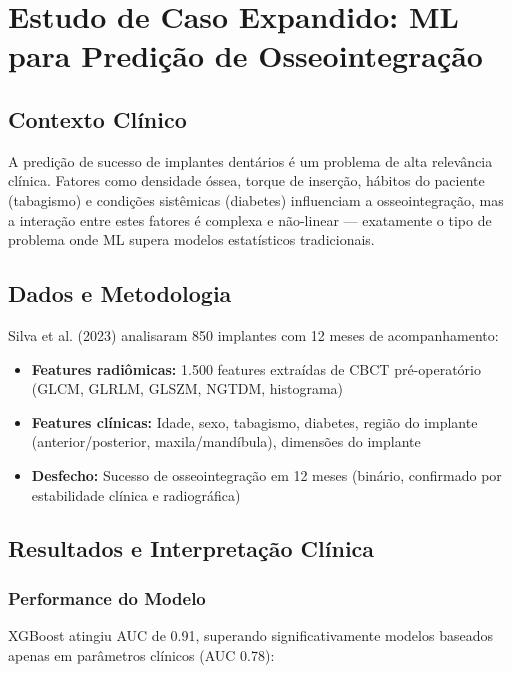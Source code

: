 \section{Estudo de Caso Expandido: ML para Predição de Osseointegração}

\subsection{Contexto Clínico}

A predição de sucesso de implantes dentários é um problema de alta relevância clínica. Fatores como densidade óssea, torque de inserção, hábitos do paciente (tabagismo) e condições sistêmicas (diabetes) influenciam a osseointegração, mas a interação entre estes fatores é complexa e não-linear — exatamente o tipo de problema onde ML supera modelos estatísticos tradicionais.

\subsection{Dados e Metodologia}

Silva et al. (2023) \cite{ODT-056} analisaram 850 implantes com 12 meses de acompanhamento:

\begin{itemize}
    \item \textbf{Features radiômicas:} 1.500 features extraídas de CBCT pré-operatório (GLCM, GLRLM, GLSZM, NGTDM, histograma)
    \item \textbf{Features clínicas:} Idade, sexo, tabagismo, diabetes, região do implante (anterior/posterior, maxila/mandíbula), dimensões do implante
    \item \textbf{Desfecho:} Sucesso de osseointegração em 12 meses (binário, confirmado por estabilidade clínica e radiográfica)
\end{itemize}

\subsection{Resultados e Interpretação Clínica}

\subsubsection{Performance do Modelo}

XGBoost atingiu AUC de 0.91, superando significativamente modelos baseados apenas em parâmetros clínicos (AUC 0.78):

